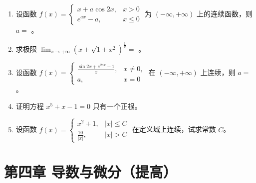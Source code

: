 \documentclass[12pt, a4paper]{article}
\newcommand{\blank}[1]{\underline{\hspace{#1}}}
\begin{document}
\begin{enumerate}
    \item 设函数 $ f(x)=\begin{cases}x+a\cos2x, & x>0\\ e^{ax}-a, & x\leq0\end{cases} $ 为 $ (-\infty,+\infty) $ 上的连续函数，则 $ a= $ \blank{2cm}。

    \item 求极限 $ \lim_{x\to+\infty}\left(x+\sqrt{1+x^{2}}\right)^{\frac{1}{x}}= $ \blank{2cm}。

    \item 设函数 $ f(x)=\begin{cases}\frac{\sin2x+e^{2ax}-1}{x}, & x\neq0,\\ a, & x=0\end{cases} $ 在 $ (-\infty,+\infty) $ 上连续，则 $ a= $ \blank{2cm}。

    \item 证明方程 $ x^{5}+x-1=0 $ 只有一个正根。

    \item 设函数 $ f(x)=\begin{cases}x^{2}+1, & |x|\leq C\\ \frac{10}{|x|}, & |x|>C\end{cases} $ 在定义域上连续，试求常数 $C$。
\end{enumerate}

\section*{第四章 导数与微分（提高）}
\end{document}
